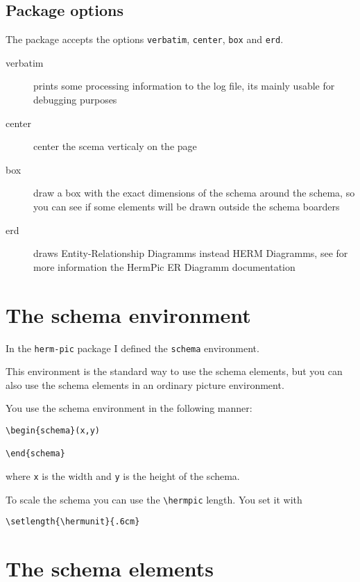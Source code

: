 \documentclass[a4paper,11pt]{article}
\begin{document}
\subsection{Package options}

The package accepts the options {\tt verbatim}, {\tt center}, {\tt box} and {\tt erd}.

\begin{description}
\item[verbatim] prints some processing information to the log file, its mainly 
  usable for debugging purposes
\item[center] center the scema verticaly on the page
\item[box] draw a box with the exact dimensions of the schema around the schema, so you
  can see if some elements will be drawn outside the schema boarders
\item[erd] draws Entity-Relationship Diagramms instead HERM Diagramms, see for more information the HermPic ER Diagramm documentation
\end{description}

\section{The schema environment}

In the {\tt herm-pic} package I defined the {\tt schema} environment.

This environment is the standard way to use the schema elements, but you 
can also use the schema elements in an ordinary picture environment.

You use the schema environment in the following manner:

\begin{verbatim}
\begin{schema}(x,y)

\end{schema}
\end{verbatim}

where {\tt x} is the width and {\tt y} is the height of 
the schema.

To scale the schema you can use the \verb|\hermpic| length.
You set it with

\begin{verbatim}
\setlength{\hermunit}{.6cm}
\end{verbatim}

\section{The schema elements}
\end{document}
